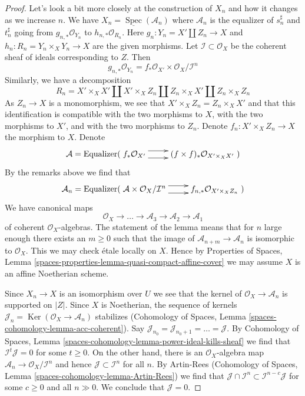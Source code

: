 \documentclass[10pt,a4paper]{amsart}
\theoremstyle{plain}
\theoremstyle{definition}
\theoremstyle{remark}
\numberwithin{equation}{subsection}
\def\Spec{\mathop{\mathrm{Spec}}}
\def\Ker{\mathop{\mathrm{Ker}}}
\begin{document}
\begin{proof}
Let's look a bit more closely at the construction of $X_n$
and how it changes as we increase $n$. We have
$X_n = \underline{\Spec}(\mathcal{A}_n)$
where $\mathcal{A}_n$ is the equalizer of $s_n^\sharp$ and $t_n^\sharp$
going from $g_{n , *}\mathcal{O}_{Y_n}$ to $h_{n, *}\mathcal{O}_{R_n}$.
Here $g_n : Y_n = X' \amalg Z_n \to X$ and $h_n : R_n = Y_n \times_X Y_n \to X$
are the given morphisms. Let $\mathcal{I} \subset \mathcal{O}_X$ be the
coherent sheaf of ideals corresponding to $Z$. Then
$$
g_{n, *}\mathcal{O}_{Y_n} =
f_*\mathcal{O}_{X'} \times \mathcal{O}_X/\mathcal{I}^n
$$
Similarly, we have a decomposition
$$
R_n = X' \times_X X' \amalg X' \times_X Z_n \amalg
Z_n \times_X X' \amalg Z_n \times_X Z_n
$$
As $Z_n \to X$ is a monomorphism, we see that
$X' \times_X Z_n = Z_n \times_X X'$ and that this identification
is compatible with the two morphisms to $X$, with the two morphisms to
$X'$, and with the two morphisms to $Z_n$.
Denote $f_n : X' \times_X Z_n \to X$ the morphism to $X$.
Denote
$$
\mathcal{A} = \text{Equalizer}(
\xymatrix{
f_*\mathcal{O}_{X'} \ar@<1ex>[r] \ar@<-1ex>[r] &
(f \times f)_*\mathcal{O}_{X' \times_X X'}
}
)
$$
By the remarks above we find that
$$
\mathcal{A}_n =
\text{Equalizer}(
\xymatrix{
\mathcal{A} \times \mathcal{O}_X/\mathcal{I}^n \ar@<1ex>[r] \ar@<-1ex>[r] &
f_{n, *}\mathcal{O}_{X' \times_X Z_n}
}
)
$$
We have canonical maps
$$
\mathcal{O}_X \to \ldots \to \mathcal{A}_3 \to \mathcal{A}_2 \to \mathcal{A}_1
$$
of coherent $\mathcal{O}_X$-algebras. The statement of the lemma means that
for $n$ large enough there exists an $m \geq 0$ such that the image of
$\mathcal{A}_{n + m} \to \mathcal{A}_n$ is isomorphic to $\mathcal{O}_X$.
This we may check \'etale locally on $X$. Hence by Properties of Spaces,
Lemma \ref{spaces-properties-lemma-quasi-compact-affine-cover}
we may assume $X$ is an affine Noetherian scheme.

\medskip\noindent
Since $X_n \to X$ is an isomorphism over $U$ we see that the kernel
of $\mathcal{O}_X \to \mathcal{A}_n$ is supported on $|Z|$.
Since $X$ is Noetherian, the sequence of kernels
$\mathcal{J}_n = \Ker(\mathcal{O}_X \to \mathcal{A}_n)$ stabilizes
(Cohomology of Spaces, Lemma \ref{spaces-cohomology-lemma-acc-coherent}).
Say $\mathcal{J}_{n_0} = \mathcal{J}_{n_0 + 1} = \ldots = \mathcal{J}$.
By Cohomology of Spaces, Lemma
\ref{spaces-cohomology-lemma-power-ideal-kills-sheaf}
we find that $\mathcal{I}^t \mathcal{J} = 0$ for some $t \geq 0$.
On the other hand, there is an $\mathcal{O}_X$-algebra map
$\mathcal{A}_n \to \mathcal{O}_X/\mathcal{I}^n$
and hence $\mathcal{J} \subset \mathcal{I}^n$ for all $n$.
By Artin-Rees (Cohomology of Spaces, Lemma
\ref{spaces-cohomology-lemma-Artin-Rees}) we find that
$\mathcal{J} \cap \mathcal{I}^n \subset \mathcal{I}^{n - c}\mathcal{J}$
for some $c  \geq 0$ and all $n \gg 0$. We conclude that $\mathcal{J} = 0$.


\end{proof}
\end{document}
